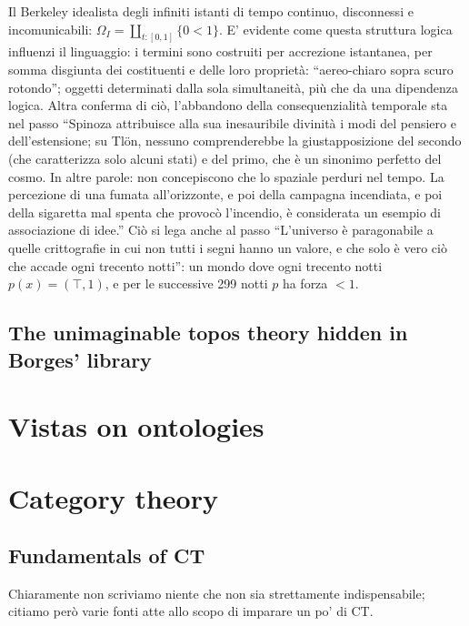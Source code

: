 \documentclass{amsart}
\begin{document}
\begin{example}
  Il Berkeley idealista degli infiniti istanti di tempo continuo, disconnessi e incomunicabili: $\Omega_I = \coprod_{t : [0,1]} \{ 0 < 1 \}$. E' evidente come questa struttura logica influenzi il linguaggio: i termini sono costruiti per accrezione istantanea, per somma disgiunta dei costituenti e delle loro proprietà: ``aereo-chiaro sopra scuro rotondo''; oggetti determinati dalla sola simultaneità, più che da una dipendenza logica. Altra conferma di ciò, l'abbandono della consequenzialità temporale sta nel passo ``Spinoza attribuisce alla sua inesauribile divinità i modi del pensiero e dell'estensione; su Tlön, nessuno comprenderebbe la giustapposizione del  secondo (che caratterizza solo alcuni stati) e del primo, che è un sinonimo  perfetto del cosmo. In altre parole: non concepiscono che lo spaziale perduri  nel tempo. La percezione di una fumata all'orizzonte, e poi della campagna  incendiata, e poi della sigaretta mal spenta che provocò l'incendio, è  considerata un esempio di associazione di idee.'' Ciò si lega anche al passo ``L'universo è paragonabile a quelle crittografie in cui non tutti i segni hanno un valore, e che solo è vero ciò che accade ogni trecento notti'': un mondo dove ogni trecento notti $p(x) =(\top,1)$, e per le successive 299 notti $p$ ha forza $<1$.
\end{example}
\begin{example}
  
\end{example}

\subsection{The unimaginable topos theory hidden in Borges' library}

\section{Vistas on ontologies}
\appendix
\section{Category theory}
\subsection{Fundamentals of CT}
Chiaramente non scriviamo niente che non sia strettamente indispensabile; citiamo però varie fonti atte allo scopo di imparare un po' di CT.
\end{document}
